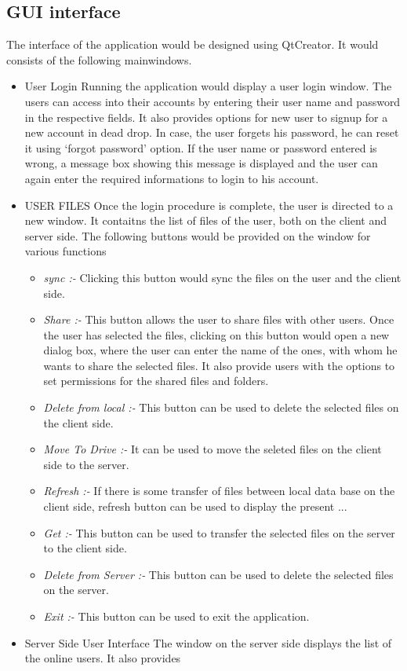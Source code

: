 \documentclass{article}
\begin{document}
			\subsection{GUI interface} 
				The interface of the application would be designed using QtCreator. It would consists of the following mainwindows.
				\begin{itemize}
					\item User Login
						\newline
						Running the application would display a user login window. The users can access into their accounts by entering their user name and password in the respective fields. It also provides options for new user to signup for a new account in dead drop. In case, the user forgets his password, he can reset it using `forgot password' option. If the user name or password entered is wrong, a message box showing this message is displayed and the user can again enter the required informations to login to his account. 
					 
					\item USER FILES
						\newline
						Once the login procedure is complete, the user is directed to a new window. It contaitns the list of files of the user, both on the client and server side. The following buttons would be provided on the window for various functions
					\begin{itemize}
						\item \textit{sync :-} Clicking this button would sync the files on the user and the client side.
						\item \textit{Share :-} This button allows the user to share files with other users. Once the user has selected the files, clicking on this button would open a new dialog box, where the user can enter the name of the ones, with whom he wants to share the selected files. It also provide users with the options to set permissions for the shared files and folders.
						\item \textit{Delete from local :-} This button can be used to delete the selected files on the client side.
						\item \textit{Move To Drive :-} It can be used to move the seleted files on the client side to the server.
						\item \textit{Refresh :-} If there is some transfer of files between local data base on the client side, refresh button can be used to display the present ...
						\item \textit{Get :-} This button can be used to transfer the selected files on the server to the client side.
						\item \textit{Delete from Server :-} This button can be used to delete the selected files on the server.
						\item \textit{Exit :-} This button can be used to exit the application.
					\end{itemize}
						
					\item Server Side User Interface
					\newline
					The window on the server side displays the list of the online users. It also provides 
				\end{itemize}
\end{document}
